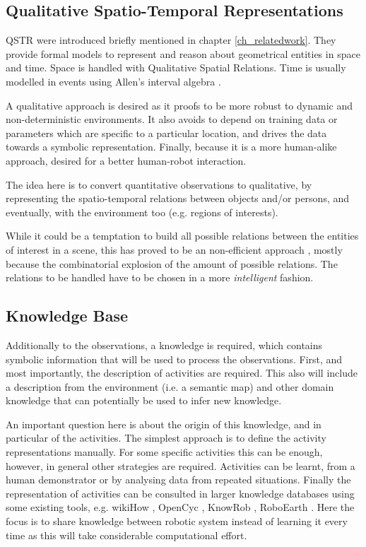 
\subsection{Qualitative Spatio-Temporal Representations}
QSTR were introduced briefly mentioned in chapter \ref{ch_relatedwork}.
They provide formal models to represent and reason about geometrical entities in space and time.
Space is handled with Qualitative Spatial Relations. %
Time is usually modelled in events using Allen's interval algebra \citep{Allen83_MaintainingKnowledgeTemporal}. %

A qualitative approach is desired as it proofs to be more robust to dynamic and non-deterministic environments.
It also avoids to depend on training data or parameters which are specific to a particular location, and drives the data towards a symbolic representation.
Finally, because it is a more human-alike approach, desired for a better human-robot interaction.

The idea here is to convert quantitative observations to qualitative, by representing the spatio-temporal relations between objects and/or persons, and eventually, with the environment too (e.g. regions of interests).

While it could be a temptation to build all possible relations between the entities of interest in a scene, this has proved to be an non-efficient approach \citep{Sridhar10_UnsupervisedLearning}, mostly because the combinatorial explosion of the amount  of possible relations. The relations to be handled have to be chosen in a more \textit{intelligent} fashion.


\subsection{Knowledge Base}
Additionally to the observations, a knowledge is required, which contains symbolic information that will be used to process the 
observations.
First, and most importantly, the description of activities are required.
This also will include a description from the environment (i.e. a semantic map) and other domain knowledge that can potentially be used to infer new knowledge.

An important question here is about the origin of this knowledge, and in particular of the activities.
The simplest approach is to define the activity representations manually.
For some specific activities this can be enough, however, in general other strategies are required.
Activities can be learnt, from a human demonstrator or by analysing data from repeated situations.
Finally the representation of activities can be consulted in larger knowledge databases using some existing tools, e.g. wikiHow \citep{web_WikiHow}, OpenCyc \citep{web_OpenCyc}, KnowRob \citep{Tenorth09_Knowrob}, RoboEarth \citep{Zweigle2009_RoboEarth}.
Here the focus is to share knowledge between robotic system instead of learning it every time as this will take considerable computational effort.


